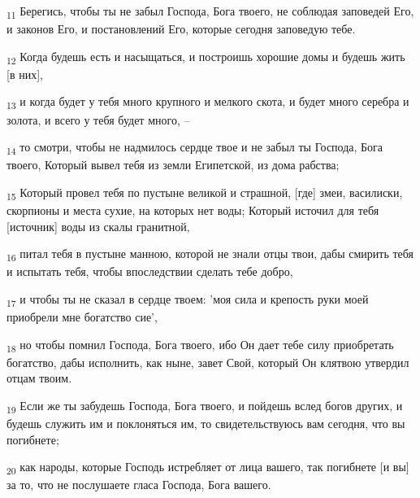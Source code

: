 \begin{tcolorbox}
\textsubscript{11} Берегись, чтобы ты не забыл Господа, Бога твоего, не соблюдая заповедей Его, и законов Его, и постановлений Его, которые сегодня заповедую тебе.
\end{tcolorbox}
\begin{tcolorbox}
\textsubscript{12} Когда будешь есть и насыщаться, и построишь хорошие домы и будешь жить [в них],
\end{tcolorbox}
\begin{tcolorbox}
\textsubscript{13} и когда будет у тебя много крупного и мелкого скота, и будет много серебра и золота, и всего у тебя будет много, --
\end{tcolorbox}
\begin{tcolorbox}
\textsubscript{14} то смотри, чтобы не надмилось сердце твое и не забыл ты Господа, Бога твоего, Который вывел тебя из земли Египетской, из дома рабства;
\end{tcolorbox}
\begin{tcolorbox}
\textsubscript{15} Который провел тебя по пустыне великой и страшной, [где] змеи, василиски, скорпионы и места сухие, на которых нет воды; Который источил для тебя [источник] воды из скалы гранитной,
\end{tcolorbox}
\begin{tcolorbox}
\textsubscript{16} питал тебя в пустыне манною, которой не знали отцы твои, дабы смирить тебя и испытать тебя, чтобы впоследствии сделать тебе добро,
\end{tcolorbox}
\begin{tcolorbox}
\textsubscript{17} и чтобы ты не сказал в сердце твоем: 'моя сила и крепость руки моей приобрели мне богатство сие',
\end{tcolorbox}
\begin{tcolorbox}
\textsubscript{18} но чтобы помнил Господа, Бога твоего, ибо Он дает тебе силу приобретать богатство, дабы исполнить, как ныне, завет Свой, который Он клятвою утвердил отцам твоим.
\end{tcolorbox}
\begin{tcolorbox}
\textsubscript{19} Если же ты забудешь Господа, Бога твоего, и пойдешь вслед богов других, и будешь служить им и поклоняться им, то свидетельствуюсь вам сегодня, что вы погибнете;
\end{tcolorbox}
\begin{tcolorbox}
\textsubscript{20} как народы, которые Господь истребляет от лица вашего, так погибнете [и вы] за то, что не послушаете гласа Господа, Бога вашего.
\end{tcolorbox}
